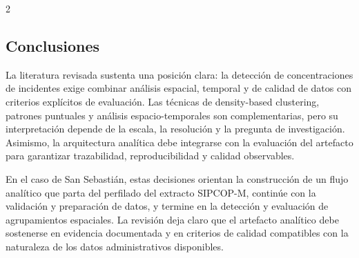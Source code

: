 \documentclass[10pt,twoside]{article}
\begin{document}
\begin{multicols}{2}
\subsection{Conclusiones}

La literatura revisada sustenta una posición clara: la detección de concentraciones de incidentes exige combinar análisis espacial, temporal y de calidad de datos con criterios explícitos de evaluación. Las técnicas de density-based clustering, patrones puntuales y análisis espacio-temporales son complementarias, pero su interpretación depende de la escala, la resolución y la pregunta de investigación. Asimismo, la arquitectura analítica debe integrarse con la evaluación del artefacto para garantizar trazabilidad, reproducibilidad y calidad observables.

En el caso de San Sebastián, estas decisiones orientan la construcción de un flujo analítico que parta del perfilado del extracto SIPCOP-M, continúe con la validación y preparación de datos, y termine en la detección y evaluación de agrupamientos espaciales. La revisión deja claro que el artefacto analítico debe sostenerse en evidencia documentada y en criterios de calidad compatibles con la naturaleza de los datos administrativos disponibles.




\end{multicols}
\end{document}
